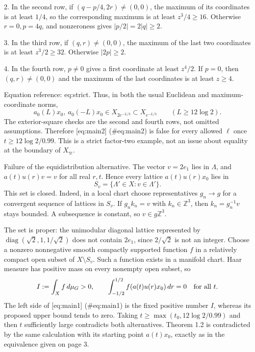 \documentclass[10pt]{article}
\begin{document}
2. In the second row, if \((q-p/4,2r)\ne(0,0)\), the maximum of its coordinates is at least \(1/4\), so the corresponding maximum is at least \(z^3/4\geq16\). Otherwise \(r=0,p=4q\), and nonzeroness gives \(|p/2|=2|q|\geq2\).\par
3. In the third row, if \((q,r)\ne(0,0)\), the maximum of the last two coordinates is at least \(z^3/2\geq32\). Otherwise \(|2p|\geq2\).\par
4. In the fourth row, \(p\ne0\) gives a first coordinate at least \(z^4/2\). If \(p=0\), then \((q,r)\ne(0,0)\) and the maximum of the last coordinates is at least \(z\geq4\).\par
Equation reference: eq:strict. Thus, in both the usual Euclidean and maximum-coordinate norms, \[a_0(L)x_0,\ a_0(-L)x_0\in X_{2e^{-L/3}}\subset X_{e^{-L/3}}
 \qquad(L\geq12\log2).\] The exterior-square checks are the second and fourth rows, not omitted assumptions. Therefore [eq:main2] (\#eq:main2) is false for every allowed \(\ell\) once \(t\geq12\log2/0.99\). This is a strict factor-two example, not an issue about equality at the boundary of \(X_\varpi\).\par
Failure of the equidistribution alternative. The vector \(v=2e_1\) lies in \(\Lambda\), and \(a(t)u(r)v=v\) for all real \(r,t\). Hence every lattice \(a(t)u(r)x_0\) lies in \[S_v=\{\Lambda'\in X:v\in\Lambda'\}.\] This set is closed. Indeed, in a local chart choose representatives \(g_n\to g\) for a convergent sequence of lattices in \(S_v\). If \(g_nk_n=v\) with \(k_n\in\mathbb Z^3\), then \(k_n=g_n^{-1}v\) stays bounded. A subsequence is constant, so \(v\in g\mathbb Z^3\).\par
The set is proper: the unimodular diagonal lattice represented by \(\operatorname{diag}(\sqrt2,1,1/\sqrt2)\) does not contain \(2e_1\), since \(2/\sqrt2\) is not an integer. Choose a nonzero nonnegative smooth compactly supported function \(f\) in a relatively compact open subset of \(X\setminus S_v\). Such a function exists in a manifold chart. Haar measure has positive mass on every nonempty open subset, so \[I:=\int_X f\,d\mu_G>0,\qquad
 \int_{-1/2}^{1/2}f(a(t)u(r)x_0)\,dr=0
 \quad\hbox{for all }t.\] The left side of [eq:main1] (\#eq:main1) is the fixed positive number \(I\), whereas its proposed upper bound tends to zero. Taking \(t\geq\max(t_0,12\log2/0.99)\) and then \(t\) sufficiently large contradicts both alternatives. Theorem 1.2 is contradicted by the same calculation with its starting point \(a(t)x_0\), exactly as in the equivalence given on page 3.\par
\end{document}
